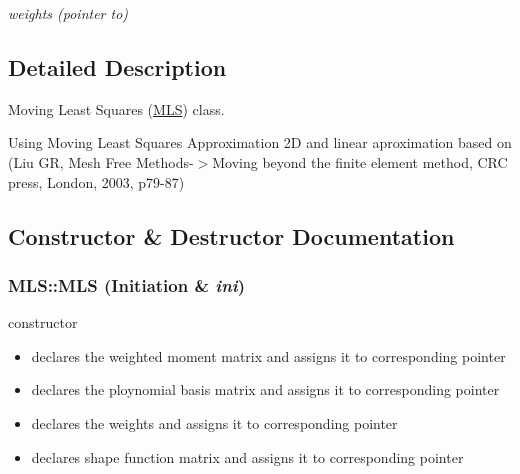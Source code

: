 \begin{CompactItemize}
\begin{CompactList}\small\item\em weights (pointer to) \item\end{CompactList}\end{CompactItemize}


\subsection{Detailed Description}
Moving Least Squares (\hyperlink{classMLS}{MLS}) class. 

Using Moving Least Squares Approximation 2D and linear aproximation based on (Liu GR, Mesh Free Methods-$>$Moving beyond the finite element method, CRC press, London, 2003, p79-87) 

\subsection{Constructor \& Destructor Documentation}
\hypertarget{classMLS_69c81b7b81631bb306259deaf925cac3}{
\subsubsection[{MLS}]{\setlength{\rightskip}{0pt plus 5cm}MLS::MLS ({\bf Initiation} \& {\em ini})}}
\label{classMLS_69c81b7b81631bb306259deaf925cac3}


constructor 



\begin{itemize}
\item declares the weighted moment matrix and assigns it to corresponding pointer\end{itemize}


\begin{itemize}
\item declares the ploynomial basis matrix and assigns it to corresponding pointer\end{itemize}


\begin{itemize}
\item declares the weights and assigns it to corresponding pointer\end{itemize}


\begin{itemize}
\item declares shape function matrix and assigns it to corresponding pointer\end{itemize}


